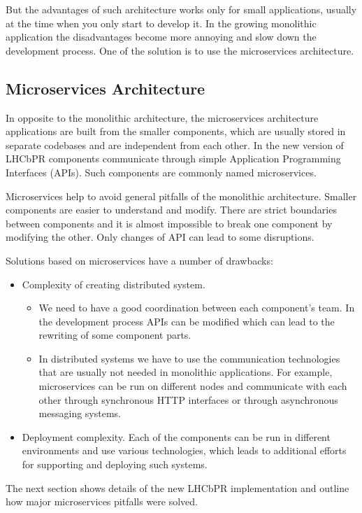 \documentclass[a4paper]{jpconf}
\begin{document}
But the advantages of such architecture works only for small applications,
usually at the time when you only start to develop it. In the growing
monolithic application the disadvantages become more annoying and slow down the
development process. One of the solution is to use the microservices architecture.  

\subsection{Microservices Architecture}

In opposite to the monolithic architecture, the microservices architecture
applications are built from the smaller components, which are usually  stored
in separate codebases and are independent from each other. In the new version of LHCbPR
components communicate through simple Application Programming
Interfaces (APIs). Such components are commonly named microservices.

Microservices help to avoid general pitfalls of the monolithic architecture.
Smaller components are easier to understand and modify. There are strict boundaries
between components and it is almost impossible to break one component by modifying
the other. Only changes of API can lead to some  disruptions.   

Solutions based on microservices have a number of drawbacks:
\begin{itemize}
\item Complexity of creating distributed system.
\begin{itemize}
\item We need to have a good coordination between  each component's team. In 
the development process APIs can be modified which can lead to the rewriting of
some component parts. 
\item In distributed systems we have to use the communication technologies that
are usually not needed in monolithic applications. For example, microservices can be
run on different nodes and communicate with each other through synchronous HTTP
interfaces or through asynchronous messaging systems.  
\end{itemize}
\item Deployment complexity.  Each of the components can be run in  different
environments and use various technologies, which leads to additional efforts for
supporting and deploying such systems.
\end{itemize}

The next section shows details of the new LHCbPR implementation and outline how
major microservices pitfalls were solved.
\end{document}

